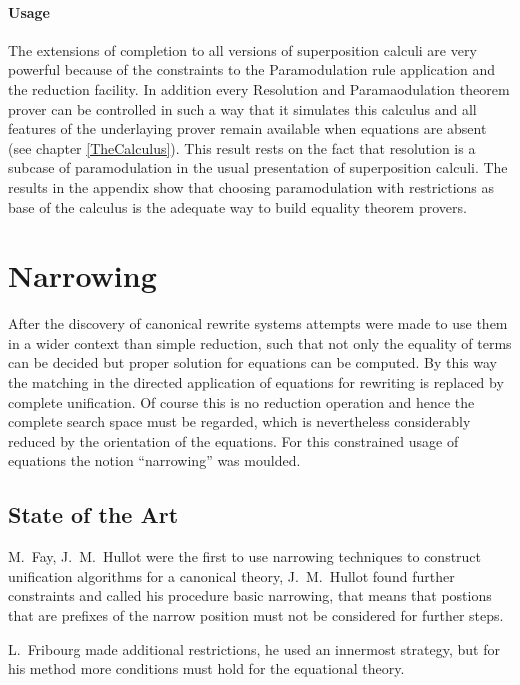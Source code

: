 \paragraph{Usage}

The extensions of completion to all versions of superposition calculi are 
very powerful because of the constraints to the Paramodulation rule 
application and the reduction facility. In addition every Resolution and 
Paramaodulation theorem prover can be controlled in such 
a way that it simulates this
calculus and all features of the underlaying prover remain available when 
equations are absent (see chapter \ref{TheCalculus}). This result rests on
the fact that resolution is a subcase of paramodulation in the usual
presentation of superposition calculi. The results in the appendix show
that choosing paramodulation with restrictions as base of the calculus is
the adequate way to build equality theorem provers.

\section{Narrowing}
\label{NarrowingtoSupportDifferenceReduction}

After the discovery of canonical rewrite systems attempts were made to use
them in a wider context than simple reduction, such that not only the
equality of terms can be decided but proper solution for equations can be
computed. By this way the matching in the directed application of equations
for rewriting is replaced by complete unification. Of course this is no
reduction operation and hence the complete search space must be regarded,
which is nevertheless considerably reduced by the orientation of the
equations. For this constrained usage of equations the notion ``narrowing'' was
moulded.

\subsection{State of the Art}

M.\ Fay, J.\ M.\ Hullot \cite{Fay79,Hullot80} were the first
to use narrowing techniques to construct unification 
algorithms for a  canonical theory, J.\ M.\ Hullot found further
constraints and called his procedure basic narrowing, that means 
that postions that are prefixes of the narrow position must 
not be considered for further steps.

L.\ Fribourg \cite{Fribourg84,Fribourg85a,Fribourg85b} made additional
restrictions, he used an innermost strategy, but for his method
more conditions must hold for the equational theory. 

